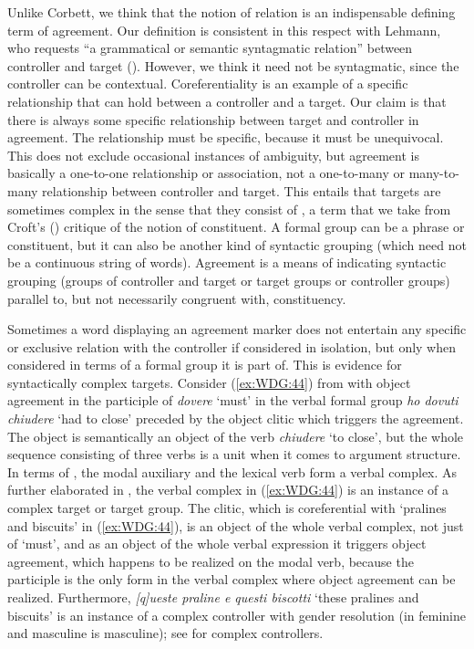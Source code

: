 \documentclass[output=collectionpaper]{langsci/langscibook}
\begin{document}
Unlike Corbett, we think that the notion of relation is an indispensable defining term of agreement. Our definition is consistent in this respect with Lehmann, who requests ``a grammatical or semantic syntagmatic relation'' between controller and target (\citealt[203]{Lehmann1982}). However, we think it need not be syntagmatic, since the controller can be contextual. Coreferentiality is an example of a specific relationship that can hold between a controller and a target. Our claim is that there is always some specific relationship between target and controller in agreement. The relationship must be specific, because it must be unequivocal. This does not exclude occasional instances of ambiguity, but agreement is basically a one-to-one relationship or association, not a one-to-many or many-to-many relationship between controller and target. This entails that targets are sometimes complex in the sense that they consist of , a term that we take from Croft's (\citeyear[190]{Croft2001}) critique of the notion of constituent. A formal group can be a phrase or constituent, but it can also be another kind of syntactic grouping (which need not be a continuous string of words). Agreement is a means of indicating syntactic grouping (groups of controller and target or target groups or controller groups) parallel to, but not necessarily congruent with, constituency.

Sometimes a word displaying an agreement marker does not entertain any specific or exclusive relation with the controller if considered in isolation, but only when considered in terms of a formal group it is part of. This is evidence for syntactically complex targets. Consider (\ref{ex:WDG:44}) from  with object agreement in the participle of \textit{dovere} `must' in the verbal formal group \textit{ho dovuti chiudere} `had to close' preceded by the object clitic which triggers the agreement. The object is semantically an object of the verb \textit{chiudere} `to close', but the whole sequence consisting of three verbs is a unit when it comes to argument structure. In terms of \cite{Rizzi1982}, the modal auxiliary and the lexical verb form a verbal complex. As further elaborated in , the verbal complex in (\ref{ex:WDG:44}) is an instance of a complex target or target group. The clitic, which is coreferential with `pralines and biscuits' in (\ref{ex:WDG:44}), is an object of the whole verbal complex, not just of `must', and as an object of the whole verbal expression it triggers object agreement, which happens to be realized on the modal verb, because the participle is the only form in the verbal complex where object agreement can be realized. Furthermore, \textit{[q]ueste praline e questi biscotti} `these pralines and biscuits' is an instance of a complex controller with gender resolution (in  feminine and masculine is masculine); see  for complex controllers.
\end{document}
